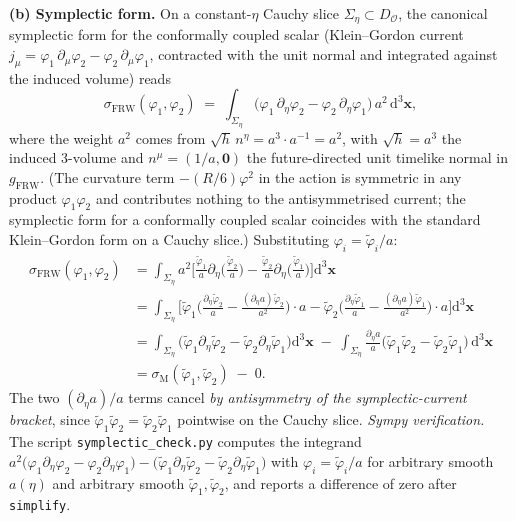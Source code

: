 \documentclass[11pt]{article}
\theoremstyle{definition}
\newcommand{\OO}{\mathcal{O}}
\newcommand{\FRW}{\mathrm{FRW}}
\newcommand{\Mink}{\mathrm{M}}
\begin{document}
\noindent\textbf{(b) Symplectic form.} On a constant-$\eta$ Cauchy slice $\Sigma_\eta\subset D_\OO$, the canonical symplectic form for the conformally coupled scalar (Klein--Gordon current $j_\mu = \varphi_1\,\partial_\mu \varphi_2 - \varphi_2\,\partial_\mu \varphi_1$, contracted with the unit normal and integrated against the induced volume) reads
\begin{equation}\label{eq:sigma-FRW-def}
\sigma_\FRW(\varphi_1,\varphi_2) \;=\; \int_{\Sigma_\eta}\big(\varphi_1\,\partial_\eta \varphi_2 - \varphi_2\,\partial_\eta \varphi_1\big)\,a^2\,\mathrm{d}^3\mathbf{x},
\end{equation}
where the weight $a^2$ comes from $\sqrt{h}\,n^\eta = a^3\cdot a^{-1} = a^2$, with $\sqrt{h}=a^3$ the induced 3-volume and $n^\mu = (1/a,\mathbf{0})$ the future-directed unit timelike normal in $g_\FRW$. (The curvature term $-(R/6)\varphi^2$ in the action is symmetric in any product $\varphi_1\varphi_2$ and contributes nothing to the antisymmetrised current; the symplectic form for a conformally coupled scalar coincides with the standard Klein--Gordon form on a Cauchy slice.) Substituting $\varphi_i = \tilde\varphi_i/a$:
\begin{align*}
\sigma_\FRW(\varphi_1,\varphi_2) &= \int_{\Sigma_\eta} a^2\Big[\tfrac{\tilde\varphi_1}{a}\partial_\eta\!\big(\tfrac{\tilde\varphi_2}{a}\big) - \tfrac{\tilde\varphi_2}{a}\partial_\eta\!\big(\tfrac{\tilde\varphi_1}{a}\big)\Big]\mathrm{d}^3\mathbf{x}\\
&= \int_{\Sigma_\eta}\Big[\tilde\varphi_1\Big(\tfrac{\partial_\eta\tilde\varphi_2}{a} - \tfrac{(\partial_\eta a)\tilde\varphi_2}{a^2}\Big)\cdot a - \tilde\varphi_2\Big(\tfrac{\partial_\eta\tilde\varphi_1}{a} - \tfrac{(\partial_\eta a)\tilde\varphi_1}{a^2}\Big)\cdot a\Big]\mathrm{d}^3\mathbf{x}\\
&= \int_{\Sigma_\eta}\big(\tilde\varphi_1\partial_\eta\tilde\varphi_2 - \tilde\varphi_2\partial_\eta\tilde\varphi_1\big)\mathrm{d}^3\mathbf{x}
\;-\; \int_{\Sigma_\eta}\frac{\partial_\eta a}{a}\big(\tilde\varphi_1\tilde\varphi_2 - \tilde\varphi_2\tilde\varphi_1\big)\,\mathrm{d}^3\mathbf{x}\\
&= \sigma_\Mink(\tilde\varphi_1,\tilde\varphi_2)\;-\;0.
\end{align*}
The two $(\partial_\eta a)/a$ terms cancel \emph{by antisymmetry of the symplectic-current bracket}, since $\tilde\varphi_1\tilde\varphi_2 = \tilde\varphi_2\tilde\varphi_1$ pointwise on the Cauchy slice. \emph{Sympy verification.} The script \texttt{symplectic\_check.py} computes the integrand
$
a^2\big(\varphi_1\partial_\eta\varphi_2 - \varphi_2\partial_\eta\varphi_1\big) - \big(\tilde\varphi_1\partial_\eta\tilde\varphi_2 - \tilde\varphi_2\partial_\eta\tilde\varphi_1\big)
$
with $\varphi_i = \tilde\varphi_i/a$ for arbitrary smooth $a(\eta)$ and arbitrary smooth $\tilde\varphi_1,\tilde\varphi_2$, and reports a difference of zero after \texttt{simplify}.
\end{document}
